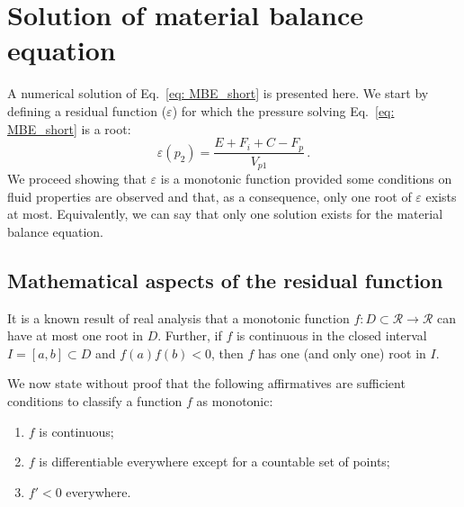 \documentclass[authoryear,preprint,review,11pt]{elsarticle}
\begin{document}

\section{Solution of material balance equation}
A numerical solution of Eq.~\eqref{eq: MBE_short} is presented here. We start by defining a residual function ($\varepsilon$) for which the pressure solving Eq.~\eqref{eq: MBE_short} is a root:
\begin{equation}\label{eq: residual}
\varepsilon(p_2) = \frac{E+F_i+C-F_p}{V_{p1}} \, .
\end{equation}
We proceed showing that $\varepsilon$ is a monotonic function provided some conditions on fluid properties are observed and that, as a consequence, only one root of $\varepsilon$ exists at most. Equivalently, we can say that only one solution exists for the material balance equation.


\subsection{Mathematical aspects of the residual function}

It is a known result of real analysis that a monotonic function $f:D\subset\mathcal{R}\rightarrow\mathcal{R}$ can have at most one root in $D$. Further, if $f$ is continuous in the closed interval $I=[a,b] \subset D$ and $f(a)f(b)<0$, then $f$ has one (and only one) root in $I$.

We now state without proof that the following affirmatives are sufficient conditions to classify a function $f$ as monotonic:
\begin{enumerate}
\item $f$ is continuous;
\item $f$ is differentiable everywhere except for a countable set of points;
\item $f'<0$ everywhere.
\end{enumerate}
\end{document}
